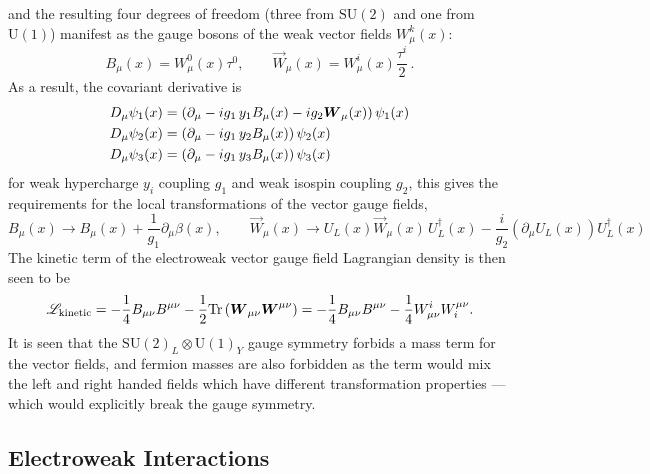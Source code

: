 and the resulting four degrees of freedom (three from $\mathrm{SU}(2)$ and one from $\mathrm{U}(1)$) manifest as the gauge bosons of the weak vector fields $W_{\mu}^{k}\left(x\right)$:
\[
 B_{\mu}\left(x\right) = W_{\mu}^{0}\left(x\right)\tau^{0}, \qquad \vec{W}_{\mu}\left(x\right) = W_{\mu}^{i}\left(x\right)\frac{\tau^{i}}{2}\,.
\]
As a result, the covariant derivative is
\begin{align}
 D_{\mu}\psi_{1}(x) & = \left(\partial_{\mu} - ig_{1}\, y_{1} B_{\mu}(x) - ig_{2} \vec{W}_{\mu}(x)\right)\psi_{1}(x)\label{eq:EW_derivative} \\
 D_{\mu}\psi_{2}(x) & = \left(\partial_{\mu} - ig_{1}\, y_{2} B_{\mu}(x)\right)\psi_{2}(x)\notag                                             \\
 D_{\mu}\psi_{3}(x) & = \left(\partial_{\mu} - ig_{1}\, y_{3} B_{\mu}(x)\right)\psi_{3}(x)\notag
\end{align}
for weak hypercharge $y_{i}$ coupling $g_{1}$ and weak isospin coupling $g_{2}$, this gives the requirements for the local transformations of the vector gauge fields,
\[
 B_{\mu}(x) \to B_{\mu}(x) + \frac{1}{g_{1}} \partial_{\mu}\beta(x), \qquad%
 \vec{W}_{\mu}(x) \to U_{L}(x)\vec{W}_{\mu}(x)\,U_{L}^{\dagger}(x) - \frac{i}{g_{2}} \left(\partial_{\mu}U_{L}(x)\right)
 U_{L}^{\dagger}(x)
\]
The kinetic term of the electroweak vector gauge field Lagrangian density is then seen to be
\[
 \Lagrangian_{\textrm{kinetic}} = -\frac{1}{4}B_{\mu\nu}B^{\mu\nu} - \frac{1}{2}\mathrm{Tr}\left(\vec{W}_{\mu\nu}\vec{W}^{\mu\nu}\right) = -\frac{1}{4}B_{\mu\nu}B^{\mu\nu} -\frac{1}{4} W_{\mu\nu}^{i} W_{i}^{\mu\nu}.
\]
It is seen that the $\mathrm{SU}(2)_{L} \otimes \mathrm{U}(1)_{Y}$ gauge symmetry forbids a mass term for the vector fields, and fermion masses are also forbidden as the term would mix the left and right handed fields which have different transformation properties --- which would explicitly break the gauge symmetry.

\subsection{Electroweak Interactions}

